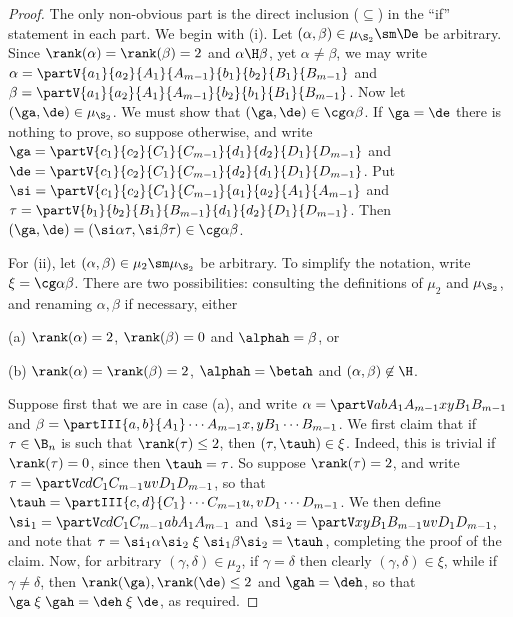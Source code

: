 \begin{proof} 
The only non-obvious part is the direct inclusion ($\subseteq$) in the ``if'' statement in each part.
%
We begin with (i).
Let $(\alpha,\beta)\in\mu_{\S_2}\sm\De$ be arbitrary.
Since $\rank(\alpha)=\rank(\beta)=2$ and $\alpha\H\beta$, yet $\alpha\not=\beta$, we may write
%
$\alpha = \partV {a_1}{a_2}{A_1}{A_{m-1}}{b_1}{b_2}{B_1}{B_{m-1}}$ and $\beta = \partV {a_1}{a_2}{A_1}{A_{m-1}}{b_2}{b_1}{B_1}{B_{m-1}}$.
%
Now let $(\ga,\de)\in\mu_{\S_2}$.  We must show that $(\ga,\de)\in\cg\alpha\beta$.
%
If $\ga=\de$ there is nothing to prove, so suppose otherwise, and write
%
$\ga = \partV {c_1}{c_2}{C_1}{C_{m-1}}{d_1}{d_2}{D_1}{D_{m-1}}$ and $\de = \partV {c_1}{c_2}{C_1}{C_{m-1}}{d_2}{d_1}{D_1}{D_{m-1}}$.
%
Put
%
$\si = \partV{c_1}{c_2}{C_1}{C_{m-1}}{a_1}{a_2}{A_1}{A_{m-1}}$ and $\tau = \partV{b_1}{b_2}{B_1}{B_{m-1}}{d_1}{d_2}{D_1}{D_{m-1}}$.
%
Then $(\ga,\de)=(\si\alpha\tau,\si\beta\tau)\in\cg\alpha\beta$.

For (ii), let $(\alpha,\beta)\in\mu_{2}\sm\mu_{\S_2}$  be arbitrary.
To simplify the notation, write $\xi=\cg\alpha\beta$.  There are two possibilities: consulting the definitions of $\mu_2$ and $\mu_{\S_2}$, and renaming $\alpha,\beta$ if necessary, either
\begin{itemize}\begin{multicols}{2}
\item[(a)] $\rank(\alpha)=2$, $\rank(\beta)=0$ and $\alphah=\beta$, or
\item[(b)] $\rank(\alpha)=\rank(\beta)=2$, $\alphah=\betah$ and $(\alpha,\beta)\not\in{\H}$.
\end{multicols}
\end{itemize}
Suppose first that we are in case (a), and write $\alpha=\partV ab{A_1}{A_{m-1}}xy{B_1}{B_{m-1}}$ and $\beta=\partIII{a,b}{A_1}\cdots{A_{m-1}}{x,y}{B_1}\cdots{B_{m-1}}$.  
We first claim that if $\tau\in\B_n$ is such that $\rank(\tau)\leq2$, then
$(\tau,\tauh)\in\xi$.  Indeed, this is trivial if $\rank(\tau)=0$, since then
$\tauh=\tau$.  So suppose $\rank(\tau)=2$, and write $\tau=\partV cd{C_1}{C_{m-1}}uv{D_1}{D_{m-1}}$, so that $\tauh=\partIII{c,d}{C_1}\cdots{C_{m-1}}{u,v}{D_1}\cdots{D_{m-1}}$.  We then define $\si_1=\partV cd{C_1}{C_{m-1}}ab{A_1}{A_{m-1}}$ and $\si_2=\partV xy{B_1}{B_{m-1}}uv{D_1}{D_{m-1}}$, and note that $\tau = \si_1\alpha\si_2 \mathrel\xi \si_1\beta\si_2 =\tauh$, completing the proof of the claim.  
Now, for arbitrary $(\gamma,\delta)\in\mu_2$, if $\gamma=\delta$ then clearly $(\gamma,\delta)\in\xi$, while if $\gamma\neq\delta$, then $\rank(\ga),\rank(\de)\leq2$ and $\gah=\deh$, so that $\ga \mathrel\xi \gah = \deh \mathrel\xi \de$, as required.  



\end{proof}
